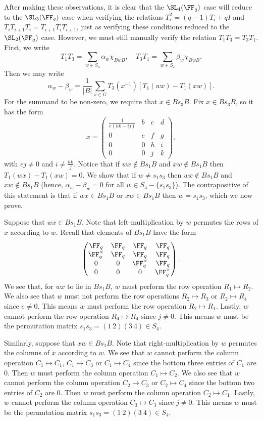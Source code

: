 \documentclass[11pt]{amsart}
\theoremstyle{remark}
\begin{document}
After making these observations, it is clear that the $\SL_4(\FF_q)$ case will reduce to the $\SL_3(\FF_q)$ case when verifying the relations $T_i^2 = (q-1)T_i + qI$ and $T_iT_{i+1}T_i = T_{i+1}T_iT_{i+1}$, just as verifying these conditions reduced to the $\SL_2(\FF_q)$ case.
However, we must still manually verify the relation $T_1T_3=T_3T_1$.
First, we write
\[
	T_1T_3 = \sum_{w\in S_4} \alpha_w \chi_{BwB},\quad T_3T_1 = \sum_{w\in S_4} \beta_w \chi_{BwB}.
\]
Then we may write
\[
	\alpha_w-\beta_w = \frac{1}{|B|}\sum_{x\in G} T_3(x^{-1})[T_1(wx)-T_1(xw)].
\]
For the summand to be non-zero, we require that $x\in Bs_3B$.
Fix $x\in Bs_3B$, so it has the form
\[
	x = \begin{pmatrix}
		\frac{1}{e(hk-ij)} & b & c & d \\
		0                  & e & f & g \\
		0                  & 0 & h & i \\
		0                  & 0 & j & k
	\end{pmatrix},
\]
with $ej\neq 0$ and $i\neq\frac{hk}{j}$.
Notice that if $wx\notin Bs_1B$ and $xw\notin Bs_1B$ then $T_1(wx)-T_1(xw)=0$.
We show that if $w\neq s_1s_3$ then $wx\notin Bs_1B$ and $xw\notin Bs_1B$ (hence, $\alpha_w-\beta_w=0$ for all $w\in S_4-\{s_1s_3\}$).
The contrapositive of this statement is that if $wx\in Bs_1B$ or $xw\in Bs_1B$ then $w=s_1s_3$, which we now prove.

Suppose that $wx\in Bs_1B$.
Note that left-multiplication by $w$ permutes the rows of $x$ according to $w$.
Recall that elements of $Bs_1B$ have the form
\[
	\begin{pmatrix}
		\FF_q        & \FF_q & \FF_q        & \FF_q        \\
		\FF_q^\times & \FF_q & \FF_q        & \FF_q        \\
		0            & 0     & \FF_q^\times & \FF_q        \\
		0            & 0     & 0            & \FF_q^\times
	\end{pmatrix}.
\]
We see that, for $wx$ to lie in $Bs_1B$, $w$ must perform the row operation $R_1\mapsto R_2$.
We also see that $w$ must not perform the row operations $R_2\mapsto R_3$ or $R_2\mapsto R_4$ since $e\neq 0$.
This means $w$ must perform the row operation $R_2\mapsto R_1$.
Lastly, $w$ cannot perform the row operation $R_4\mapsto R_4$ since $j\neq 0$.
This means $w$ must be the permutation matrix $s_1s_3 = (1\ 2)(3\ 4)\in S_4$.

Similarly, suppose that $xw\in Bs_1B$.
Note that right-multiplication by $w$ permutes the columns of $x$ according to $w$.
We see that $w$ cannot perform the column operation $C_1\mapsto C_1$, $C_1\mapsto C_3$ or $C_1\mapsto C_4$ since the bottom three entries of $C_1$ are $0$.
Then $w$ must perform the column operation $C_1\mapsto C_2$.
We also see that $w$ cannot perform the column operation $C_2\mapsto C_3$ or $C_2\mapsto C_4$ since the bottom two entries of $C_2$ are $0$.
Then $w$ must perform the column operation $C_2\mapsto C_1$.
Lastly, $w$ cannot perform the column operation $C_3\mapsto C_3$ since $j\neq 0$.
This means $w$ must be the permutation matrix $s_1s_3 = (1\ 2)(3\ 4)\in S_4$.
\end{document}

